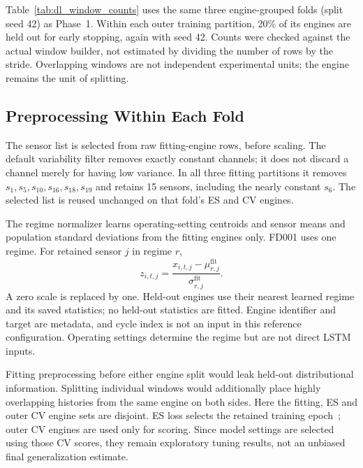 \begin{table}[t]
\centering
\caption{Window counts for $L=30$ with left padding. Fit, ES and CV denote
fitting, inner early-stopping and outer scored engines. ES/CV use only
$s=1$; the all-training row is a reference count, not an extra study fit.}
\label{tab:dl_window_counts}
\footnotesize

\end{table}

Table~\ref{tab:dl_window_counts} uses the same three engine-grouped folds
(split seed 42) as Phase~1. Within each outer training partition, 20\% of
its engines are held out for early stopping, again with seed 42.
Counts were checked against the actual window builder, not estimated by
dividing the number of rows by the stride. Overlapping windows are not
independent experimental units; the engine remains the unit of splitting.

\subsection{Preprocessing Within Each Fold}
The sensor list is selected from raw fitting-engine rows, before scaling.
The default variability filter removes exactly constant channels; it does
not discard a channel merely for having low variance. In all three fitting
partitions it removes $s_1,s_5,s_{10},s_{16},s_{18},s_{19}$ and retains 15
sensors, including the nearly constant $s_6$. The selected list is reused
unchanged on that fold's ES and CV engines.

The regime normalizer learns operating-setting centroids and sensor means
and population standard deviations from the fitting engines only. FD001
uses one regime. For retained sensor $j$ in regime $r$,
\begin{equation}
 z_{i,t,j}=\frac{x_{i,t,j}-\mu_{r,j}^{\mathrm{fit}}}
                         {\sigma_{r,j}^{\mathrm{fit}}}.
\end{equation}
A zero scale is replaced by one. Held-out engines use their nearest learned
regime and its saved statistics; no held-out statistics are fitted.
Engine identifier and target are metadata, and cycle index is not an input
in this reference configuration. Operating settings determine the regime
but are not direct LSTM inputs.

Fitting preprocessing before either engine split would leak held-out
distributional information. Splitting individual windows would additionally
place highly overlapping histories from the same engine on both sides.
Here the fitting, ES and outer CV engine sets are disjoint. ES loss selects
the retained training epoch~\cite{Prechelt1998early}; outer CV engines are
used only for scoring. Since model settings are selected using those CV
scores, they remain exploratory tuning results, not an unbiased final
generalization estimate.

